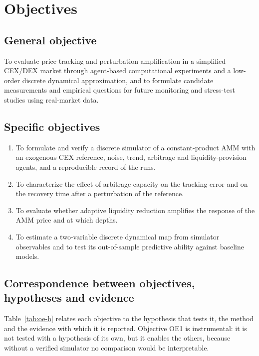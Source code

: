 \chapter{Objectives}
\label{cap:objetivos}

\section{General objective}

To evaluate price tracking and perturbation amplification in a simplified CEX/DEX market through agent-based computational experiments and a low-order discrete dynamical approximation, and to formulate candidate measurements and empirical questions for future monitoring and stress-test studies using real-market data.

\section{Specific objectives}

\begin{enumerate}[label=\textbf{OE\arabic*.}, leftmargin=3em]
  \item To formulate and verify a discrete simulator of a constant-product AMM with an exogenous CEX reference, noise, trend, arbitrage and liquidity-provision agents, and a reproducible record of the runs.
  \item To characterize the effect of arbitrage capacity on the tracking error and on the recovery time after a perturbation of the reference.
  \item To evaluate whether adaptive liquidity reduction amplifies the response of the AMM price and at which depths.
  \item To estimate a two-variable discrete dynamical map from simulator observables and to test its out-of-sample predictive ability against baseline models.
\end{enumerate}

\section{Correspondence between objectives, hypotheses and evidence}

Table~\ref{tab:oe-h} relates each objective to the hypothesis that tests it, the method and the evidence with which it is reported. Objective OE1 is instrumental: it is not tested with a hypothesis of its own, but it enables the others, because without a verified simulator no comparison would be interpretable.

